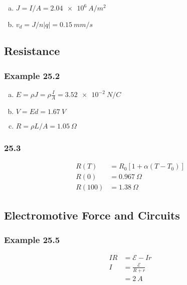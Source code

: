\documentclass{article}
\begin{document}
\begin{enumerate}[(a)]
  \item $J = I / A = \qty{2.04e6}{A/m^2}$

  \item $v_d = J / n |q| = \qty{0.15}{mm/s}$
\end{enumerate}

\setcounter{subsection}{2}
\subsection{Resistance}

\subsubsection{Example 25.2}

\begin{enumerate}[(a)]
  \item $E = \rho J = \rho \frac{I}{A} = \qty{3.52e-2}{N/C}$

  \item $V = E d = \qty{1.67}{V}$

  \item $R = \rho L / A = \qty{1.05}{\Omega}$
\end{enumerate}

\subsubsection{25.3}

\begin{align*}
  R(T)   & = R_0 [1 + \alpha (T - T_0)] \\
  R(0)   & = \qty{0.967}{\Omega}        \\
  R(100) & = \qty{1.38}{\Omega}
\end{align*}

\subsection{Electromotive Force and Circuits}

\subsubsection{Example 25.5}

\begin{align*}
  I R & = \mathcal{E} - I r         \\
  I   & = \frac{\mathcal{E}}{R + r} \\
      & = \qty{2}{A}
\end{align*}
\end{document}
